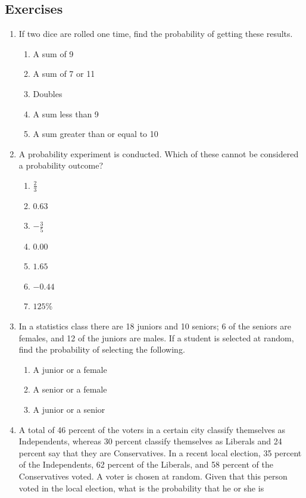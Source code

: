 \documentclass{article}
\begin{document}
\subsection{Exercises}
\begin{enumerate}
    \item If two dice are rolled one time, find the probability of getting these results.
    \begin{enumerate}
        \item A sum of 9
        \item A sum of 7 or 11
        \item Doubles
        \item A sum less than 9
        \item A sum greater than or equal to 10
    \end{enumerate}
    \item A probability experiment is conducted. Which of these cannot be considered a probability outcome?
    \begin{enumerate}
        \item $\frac{2}{3}$
        \item $0.63$
        \item $-\frac{3}{5}$
        \item $0.00$
        \item $1.65$
        \item $-0.44$
        \item $125$\%
    \end{enumerate}
    \item In a statistics class there are 18 juniors and 10 seniors; 6 of the seniors are females, and 12 of the juniors are males. If a student is selected at random, find the probability of selecting the following.
    \begin{enumerate}
        \item A junior or a female
        \item A senior or a female
        \item A junior or a senior
    \end{enumerate}
    \item A total of 46 percent of the voters in a certain city classify themselves as Independents, whereas 30 percent classify themselves as Liberals and 24 percent say that they are Conservatives. In a recent local election, 35 percent of the Independents, 62 percent of the Liberals, and 58 percent of the Conservatives voted. A voter is chosen at random. Given that this person voted in the local election, what is the probability that he or she is

\end{enumerate}
\end{document}
